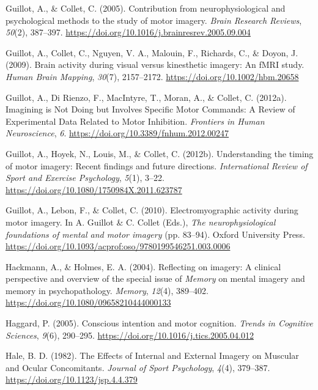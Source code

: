 \documentclass[a4paper,12pt,twoside,openright,oldfontcommands]{memoir}
\begin{document}
\leavevmode\hypertarget{ref-guillot_contribution_2005}{}%
Guillot, A., \& Collet, C. (2005). Contribution from neurophysiological and psychological methods to the study of motor imagery. \emph{Brain Research Reviews}, \emph{50}(2), 387--397. \url{https://doi.org/10.1016/j.brainresrev.2005.09.004}

\leavevmode\hypertarget{ref-guillot_brain_2009}{}%
Guillot, A., Collet, C., Nguyen, V. A., Malouin, F., Richards, C., \& Doyon, J. (2009). Brain activity during visual versus kinesthetic imagery: An fMRI study. \emph{Human Brain Mapping}, \emph{30}(7), 2157--2172. \url{https://doi.org/10.1002/hbm.20658}

\leavevmode\hypertarget{ref-guillot_imagining_2012}{}%
Guillot, A., Di Rienzo, F., MacIntyre, T., Moran, A., \& Collet, C. (2012a). Imagining is Not Doing but Involves Specific Motor Commands: A Review of Experimental Data Related to Motor Inhibition. \emph{Frontiers in Human Neuroscience}, \emph{6}. \url{https://doi.org/10.3389/fnhum.2012.00247}

\leavevmode\hypertarget{ref-guillot_understanding_2012}{}%
Guillot, A., Hoyek, N., Louis, M., \& Collet, C. (2012b). Understanding the timing of motor imagery: Recent findings and future directions. \emph{International Review of Sport and Exercise Psychology}, \emph{5}(1), 3--22. \url{https://doi.org/10.1080/1750984X.2011.623787}

\leavevmode\hypertarget{ref-guillot_electromyographic_2010}{}%
Guillot, A., Lebon, F., \& Collet, C. (2010). Electromyographic activity during motor imagery. In A. Guillot \& C. Collet (Eds.), \emph{The neurophysiological foundations of mental and motor imagery} (pp. 83--94). Oxford University Press. \url{https://doi.org/10.1093/acprof:oso/9780199546251.003.0006}

\leavevmode\hypertarget{ref-hackmann_reflecting_2004}{}%
Hackmann, A., \& Holmes, E. A. (2004). Reflecting on imagery: A clinical perspective and overview of the special issue of \emph{Memory} on mental imagery and memory in psychopathology. \emph{Memory}, \emph{12}(4), 389--402. \url{https://doi.org/10.1080/09658210444000133}

\leavevmode\hypertarget{ref-haggard_conscious_2005}{}%
Haggard, P. (2005). Conscious intention and motor cognition. \emph{Trends in Cognitive Sciences}, \emph{9}(6), 290--295. \url{https://doi.org/10.1016/j.tics.2005.04.012}

\leavevmode\hypertarget{ref-hale_effects_1982}{}%
Hale, B. D. (1982). The Effects of Internal and External Imagery on Muscular and Ocular Concomitants. \emph{Journal of Sport Psychology}, \emph{4}(4), 379--387. \url{https://doi.org/10.1123/jsp.4.4.379}
\end{document}
